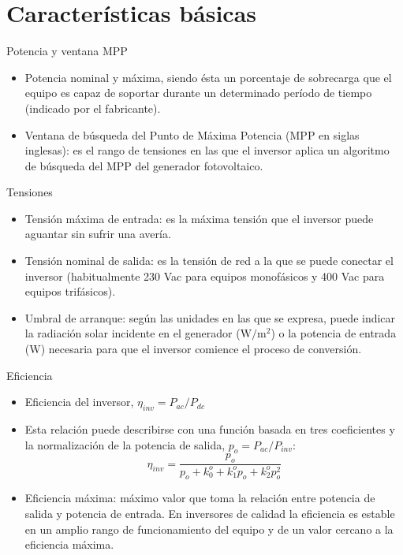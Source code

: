 \documentclass[aspectratio=169, usenames,svgnames,dvipsnames]{beamer}
\begin{document}
\section{Características básicas}
\label{sec:org4bd347b}
\begin{frame}[label={sec:org8e16eb7}]{Potencia y ventana MPP}
\begin{itemize}
\item \alert{Potencia nominal y máxima}, siendo ésta un porcentaje de sobrecarga
que el equipo es capaz de soportar durante un determinado período de
tiempo (indicado por el fabricante).

\item \alert{Ventana de búsqueda del Punto de Máxima Potencia} (MPP en siglas
inglesas): es el rango de tensiones en las que el inversor aplica un
algoritmo de búsqueda del MPP del generador fotovoltaico.
\end{itemize}
\end{frame}
\begin{frame}[label={sec:org3ac21c7}]{Tensiones}
\begin{itemize}
\item \alert{Tensión máxima de entrada}: es la máxima tensión que el inversor
puede aguantar sin sufrir una avería.

\item \alert{Tensión nominal de salida}: es la tensión de red a la que se puede
conectar el inversor (habitualmente 230 Vac para equipos monofásicos
y 400 Vac para equipos trifásicos).

\item \alert{Umbral de arranque}: según las unidades en las que se expresa, puede
indicar la radiación solar incidente en el generador
(\(\si{\watt\per\meter\squared}\)) o la potencia de entrada (W)
necesaria para que el inversor comience el proceso de conversión.
\end{itemize}
\end{frame}
\begin{frame}[label={sec:org2183b15}]{Eficiencia}
\begin{itemize}
\item \alert{Eficiencia del inversor}, \(\eta_{inv} = P_{ac} / P_{dc}\)

\item Esta relación puede describirse con una función basada en tres
coeficientes y la normalización de la potencia de salida,
\(p_{o}=P_{ac}/P_{inv}\):
$$\eta_{inv}=\frac{p_{o}}{p_{o}+k_{0}^{o}+k_{1}^{o}p_{o}+k_{2}^{o}p_{o}^{2}}$$

\item \alert{Eficiencia máxima}: máximo valor que toma la relación entre
potencia de salida y potencia de entrada. En inversores de calidad
la eficiencia es estable en un amplio rango de funcionamiento del
equipo y de un valor cercano a la eficiencia máxima.
\end{itemize}
\end{frame}
\end{document}
